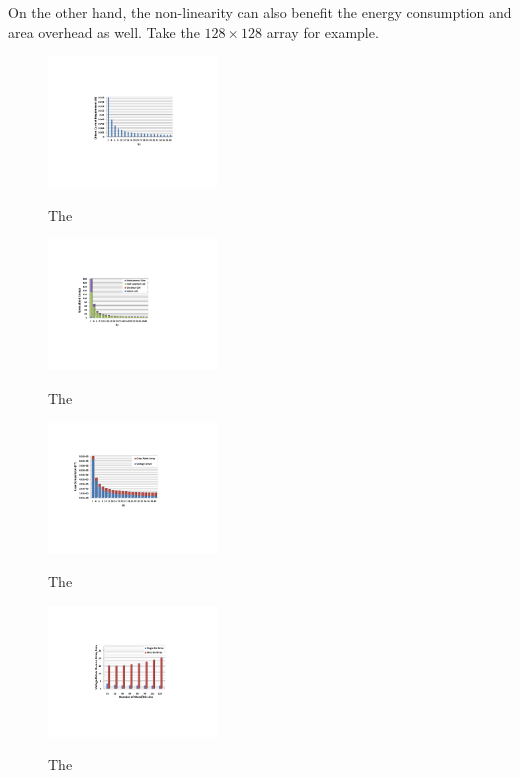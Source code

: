 On the other hand, the non-linearity can also benefit the energy consumption and area overhead as well. Take the $128 \times 128$ array for example.


\begin{figure}%
\centering
  \includegraphics[width=0.4\textwidth]{./figures/non_linear_I.pdf}\\
  \caption{The}\label{fig:non_linear_I}
\end{figure}

\begin{figure}%
\centering
  \includegraphics[width=0.4\textwidth]{./figures/non_linear_energy.pdf}\\
  \caption{The}\label{fig:non_linear_energy}
\end{figure}

\begin{figure}%
\centering
  \includegraphics[width=0.4\textwidth]{./figures/non_linear_ara.pdf}\\
  \caption{The}\label{fig:non_linear_ara}
\end{figure}

\begin{figure}%
\centering
  \includegraphics[width=0.4\textwidth]{./figures/Area_kr20.pdf}\\
  \caption{The}\label{fig:Area_kr20}
\end{figure}

